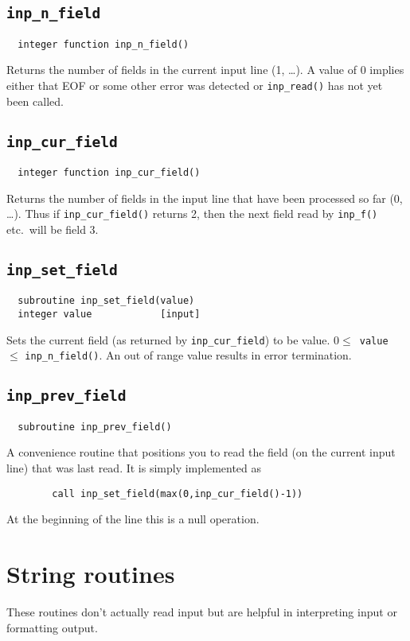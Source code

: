 \subsection{{\tt inp\_n\_field}}
\begin{verbatim}
  integer function inp_n_field()
\end{verbatim}
Returns the number of fields in the current input line (1, \ldots).  A
value of 0 implies either that EOF or some other error was detected or
{\tt inp\_read()} has not yet been called.

\subsection{{\tt inp\_cur\_field}}
\begin{verbatim}
  integer function inp_cur_field()
\end{verbatim}
Returns the number of fields in the input line that have been processed
so far (0, \ldots).  Thus if {\tt inp\_cur\_field()} returns 2, then the next
field read by {\tt inp\_f()} etc.\ will be field 3.

\subsection{{\tt inp\_set\_field}}
\begin{verbatim}
  subroutine inp_set_field(value)
  integer value            [input]
\end{verbatim}
Sets the current field (as returned by \verb+inp_cur_field+) to be
value.  $0 \le$~{\tt value}~$\le$ {\tt inp\_n\_field()}.  An out of
range value results in error termination.

\subsection{{\tt inp\_prev\_field}}
\begin{verbatim}
  subroutine inp_prev_field()
\end{verbatim}
A convenience routine that positions you to read the field (on the
current input line) that was last read.  It is simply implemented as
\begin{verbatim}
        call inp_set_field(max(0,inp_cur_field()-1))
\end{verbatim}
At the beginning of the line this is a null operation.


\section{String routines}
These routines don't actually read input but are helpful in
interpreting input or formatting output.

